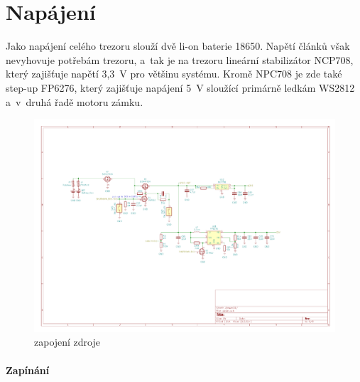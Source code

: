 \section{Napájení}

Jako napájení celého trezoru slouží dvě li-on baterie 18650. Napětí článků však nevyhovuje potřebám trezoru, a~tak je na trezoru lineární 
stabilizátor NCP708, který zajišťuje napětí 3,3~V pro většinu systému. Kromě NPC708 je zde také step-up FP6276, který zajišťuje napájení 5~V 
sloužící primárně ledkám WS2812 a~v~druhá řadě motoru zámku. 

\begin{figure}[htbp]
    \centering
    \includegraphics[width=\textwidth]{kapitoly/obrazky/E4/napajeni/zdroj.pdf}
    \caption{zapojení zdroje}
    \label{fig:zdroj}
\end{figure}  %

\newpage

\paragraph*{Zapínání}

